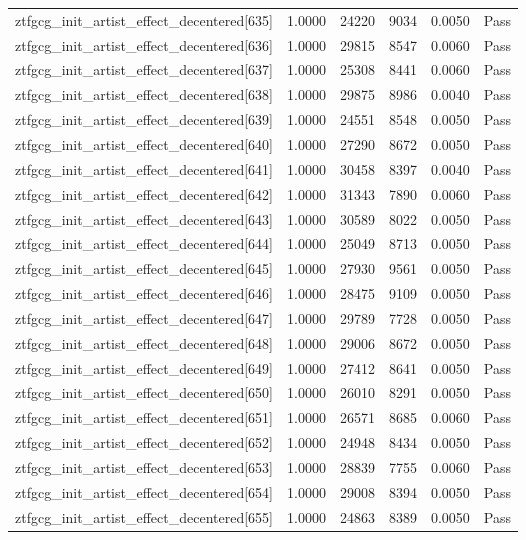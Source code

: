 \begin{table}[htbp]
\begin{tabular}{llrrll}
ztfgcg\_init\_artist\_effect\_decentered[635] & 1.0000 & 24220 & 9034 & 0.0050 & Pass \\
ztfgcg\_init\_artist\_effect\_decentered[636] & 1.0000 & 29815 & 8547 & 0.0060 & Pass \\
ztfgcg\_init\_artist\_effect\_decentered[637] & 1.0000 & 25308 & 8441 & 0.0060 & Pass \\
ztfgcg\_init\_artist\_effect\_decentered[638] & 1.0000 & 29875 & 8986 & 0.0040 & Pass \\
ztfgcg\_init\_artist\_effect\_decentered[639] & 1.0000 & 24551 & 8548 & 0.0050 & Pass \\
ztfgcg\_init\_artist\_effect\_decentered[640] & 1.0000 & 27290 & 8672 & 0.0050 & Pass \\
ztfgcg\_init\_artist\_effect\_decentered[641] & 1.0000 & 30458 & 8397 & 0.0040 & Pass \\
ztfgcg\_init\_artist\_effect\_decentered[642] & 1.0000 & 31343 & 7890 & 0.0060 & Pass \\
ztfgcg\_init\_artist\_effect\_decentered[643] & 1.0000 & 30589 & 8022 & 0.0050 & Pass \\
ztfgcg\_init\_artist\_effect\_decentered[644] & 1.0000 & 25049 & 8713 & 0.0050 & Pass \\
ztfgcg\_init\_artist\_effect\_decentered[645] & 1.0000 & 27930 & 9561 & 0.0050 & Pass \\
ztfgcg\_init\_artist\_effect\_decentered[646] & 1.0000 & 28475 & 9109 & 0.0050 & Pass \\
ztfgcg\_init\_artist\_effect\_decentered[647] & 1.0000 & 29789 & 7728 & 0.0050 & Pass \\
ztfgcg\_init\_artist\_effect\_decentered[648] & 1.0000 & 29006 & 8672 & 0.0050 & Pass \\
ztfgcg\_init\_artist\_effect\_decentered[649] & 1.0000 & 27412 & 8641 & 0.0050 & Pass \\
ztfgcg\_init\_artist\_effect\_decentered[650] & 1.0000 & 26010 & 8291 & 0.0050 & Pass \\
ztfgcg\_init\_artist\_effect\_decentered[651] & 1.0000 & 26571 & 8685 & 0.0060 & Pass \\
ztfgcg\_init\_artist\_effect\_decentered[652] & 1.0000 & 24948 & 8434 & 0.0050 & Pass \\
ztfgcg\_init\_artist\_effect\_decentered[653] & 1.0000 & 28839 & 7755 & 0.0060 & Pass \\
ztfgcg\_init\_artist\_effect\_decentered[654] & 1.0000 & 29008 & 8394 & 0.0050 & Pass \\
ztfgcg\_init\_artist\_effect\_decentered[655] & 1.0000 & 24863 & 8389 & 0.0050 & Pass \\

\end{tabular}
\end{table}

